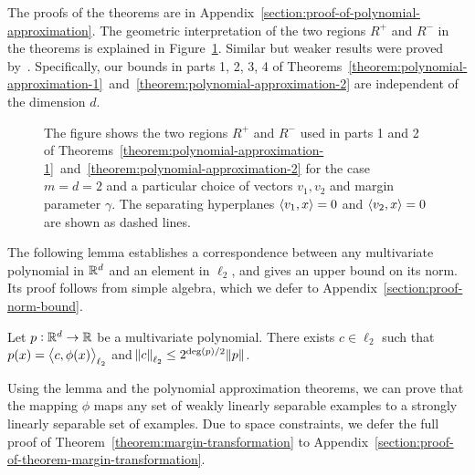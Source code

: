 The proofs of the theorems are in
Appendix~\ref{section:proof-of-polynomial-approximation}. The geometric
interpretation of the two regions $R^+$ and $R^-$ in the theorems is explained
in Figure~\ref{figure:pizza-slice}. Similar but weaker results were proved
by~\citet{Klivans-Servedio-2008}. Specifically, our bounds in parts 1, 2, 3, 4
of
Theorems~\ref{theorem:polynomial-approximation-1}~and~\ref{theorem:polynomial-approximation-2}
are independent of the dimension $d$.

\begin{figure}
\begin{center}
 \scalebox{.65}{}
\end{center}
\caption[]{The figure shows the two regions $R^+$ and $R^-$ used in parts 1 and
2 of
Theorems~\ref{theorem:polynomial-approximation-1}~and~\ref{theorem:polynomial-approximation-2}
for the case $m=d=2$ and a particular choice of vectors $v_1, v_2$ and margin
parameter $\gamma$. The separating hyperplanes $\left\langle v_1, x \right\rangle = 0$ and
$\left\langle v_2, x \right\rangle = 0$ are shown as dashed lines.}
\label{figure:pizza-slice}
\end{figure}

The following lemma establishes a correspondence between any multivariate
polynomial in $\mathbb{R}^d$ and an element in $\ell_2$, and gives an upper bound on its
norm. Its proof follows from simple algebra, which we defer to
Appendix~\ref{section:proof-norm-bound}.

\begin{lemma}
\label{lemma:norm-bound}
Let $p:\mathbb{R}^d \to \mathbb{R}$ be a multivariate polynomial.
There exists $c \in \ell_2$ such that $p(x) = \left\langle c, \phi(x) \right\rangle_{\ell_2}$
and $\norm{c}_{\ell_2} \le 2^{\deg(p)/2} \norm{p}$.
\end{lemma}

Using the lemma and the polynomial approximation theorems, we can prove that the
mapping $\phi$ maps any set of weakly linearly separable examples to a strongly
linearly separable set of examples. Due to space constraints, we defer the full
proof of Theorem~\ref{theorem:margin-transformation} to
Appendix~\ref{section:proof-of-theorem-margin-transformation}.


